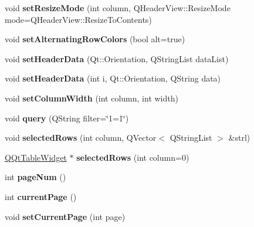 \begin{DoxyCompactItemize}
\mbox{\label{class_q_qt_multi_page_table_widget_a9642df40aaeac8527a944805f21fdb59}} 
void {\bfseries set\+Resize\+Mode} (int column, Q\+Header\+View\+::\+Resize\+Mode mode=Q\+Header\+View\+::\+Resize\+To\+Contents)
\item 
\mbox{\label{class_q_qt_multi_page_table_widget_a29473350795715cfc9eaf0f143ee70ae}} 
void {\bfseries set\+Alternating\+Row\+Colors} (bool alt=true)
\item 
\mbox{\label{class_q_qt_multi_page_table_widget_a4dae35ed532ec582e3dc7d49881b7ed5}} 
void {\bfseries set\+Header\+Data} (Qt\+::\+Orientation, Q\+String\+List data\+List)
\item 
\mbox{\label{class_q_qt_multi_page_table_widget_ab05d02d35fbde9b327c3117ab9045ed2}} 
void {\bfseries set\+Header\+Data} (int i, Qt\+::\+Orientation, Q\+String data)
\item 
\mbox{\label{class_q_qt_multi_page_table_widget_a7aadaa155857a945b4c6c6d47d1056a2}} 
void {\bfseries set\+Column\+Width} (int column, int width)
\item 
\mbox{\label{class_q_qt_multi_page_table_widget_a3dc2f2ea39424a98af0759e055bb5144}} 
void {\bfseries query} (Q\+String filter=\char`\"{}1=1\char`\"{})
\item 
\mbox{\label{class_q_qt_multi_page_table_widget_a6966cc86f5eec73cfa86c025acdf208b}} 
void {\bfseries selected\+Rows} (int column, Q\+Vector$<$ Q\+String\+List $>$ \&strl)
\item 
\mbox{\label{class_q_qt_multi_page_table_widget_a5f030ec901acb1454de5c0d94ee453a8}} 
\mbox{\hyperlink{class_q_qt_table_widget}{Q\+Qt\+Table\+Widget}} $\ast$ {\bfseries selected\+Rows} (int column=0)
\item 
\mbox{\label{class_q_qt_multi_page_table_widget_aad093b2a0940a227e31a439e4fea9d2a}} 
int {\bfseries page\+Num} ()
\item 
\mbox{\label{class_q_qt_multi_page_table_widget_ac403d2695447b137bedfc20bb8446f8e}} 
int {\bfseries current\+Page} ()
\item 
\mbox{\label{class_q_qt_multi_page_table_widget_a61be3a03abbc76f5400cdcdd9727ec01}} 
void {\bfseries set\+Current\+Page} (int page)
\end{DoxyCompactItemize}


